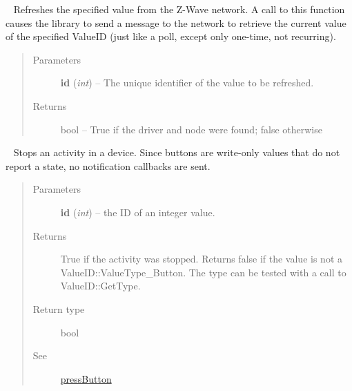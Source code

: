 \documentclass[letterpaper,10pt,english]{sphinxmanual}
\begin{document}
\begin{fulllineitems}
\begin{fulllineitems}
\label{libopenzwave:libopenzwave.PyManager.refreshValue}~\label{libopenzwave:refreshvalue}
Refreshes the specified value from the Z-Wave network.
A call to this function causes the library to send a message to the network to retrieve the current value
of the specified ValueID (just like a poll, except only one-time, not recurring).
\begin{quote}\begin{description}
\item[{Parameters}] \leavevmode
\textbf{id} (\emph{int}) -- The unique identifier of the value to be refreshed.

\item[{Returns}] \leavevmode
bool -- True if the driver and node were found; false otherwise

\end{description}\end{quote}

\end{fulllineitems}


\begin{fulllineitems}
\label{libopenzwave:libopenzwave.PyManager.releaseButton}~\label{libopenzwave:releasebutton}
Stops an activity in a device.
Since buttons are write-only values that do not report a state,
no notification callbacks are sent.
\begin{quote}\begin{description}
\item[{Parameters}] \leavevmode
\textbf{id} (\emph{int}) -- the ID of an integer value.

\item[{Returns}] \leavevmode
True if the activity was stopped. Returns false if the value is not a ValueID::ValueType\_Button. The type can be tested with a call to ValueID::GetType.

\item[{Return type}] \leavevmode
bool

\item[{See}] \leavevmode
{\hyperref[libopenzwave:pressbutton]{pressButton}}

\end{description}\end{quote}


\end{fulllineitems}
\end{fulllineitems}
\end{document}
